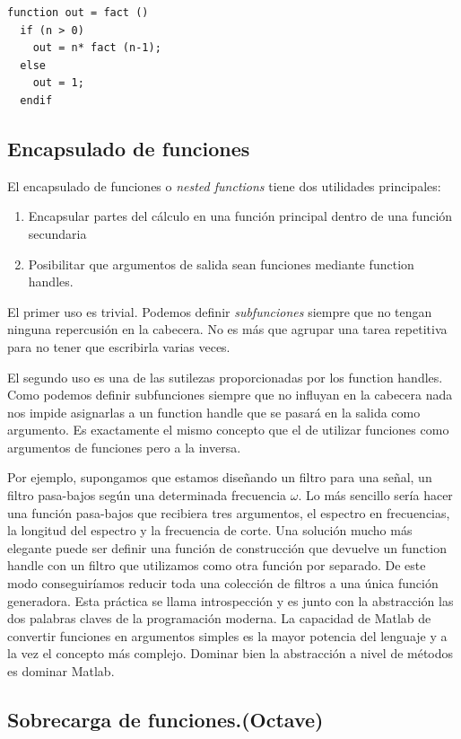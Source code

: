 \begin{lstlisting}
function out = fact ()
  if (n > 0)
    out = n* fact (n-1);
  else
    out = 1;
  endif
\end{lstlisting}

\subsection{Encapsulado de funciones}

El encapsulado de funciones o \emph{nested functions} tiene dos
utilidades principales:

\begin{enumerate}
\item Encapsular partes del cálculo en una función principal dentro de
  una función secundaria
\item Posibilitar que argumentos de salida sean funciones mediante
  function handles.
\end{enumerate}
El primer uso es trivial. Podemos definir \emph{subfunciones} siempre
que no tengan ninguna repercusión en la cabecera. No es más que
agrupar una tarea repetitiva para no tener que escribirla varias
veces.

El segundo uso es una de las sutilezas proporcionadas por los function
handles. Como podemos definir subfunciones siempre que no influyan en
la cabecera nada nos impide asignarlas a un function handle que se
pasará en la salida como argumento. Es exactamente el mismo concepto
que el de utilizar funciones como argumentos de funciones pero a la
inversa.

Por ejemplo, supongamos que estamos diseñando un filtro para una
señal, un filtro pasa-bajos según una determinada frecuencia $\omega$.
Lo más sencillo sería hacer una función pasa-bajos que recibiera tres
argumentos, el espectro en frecuencias, la longitud del espectro y la
frecuencia de corte. Una solución mucho más elegante puede ser definir
una función de construcción que devuelve un function handle con un
filtro que utilizamos como otra función por separado. De este modo
conseguiríamos reducir toda una colección de filtros a una única
función generadora. Esta práctica se llama introspección y es junto
con la abstracción las dos palabras claves de la programación moderna.
La capacidad de Matlab de convertir funciones en argumentos simples es
la mayor potencia del lenguaje y a la vez el concepto más complejo.
Dominar bien la abstracción a nivel de métodos es dominar Matlab.


\subsection{Sobrecarga de funciones.(Octave)}

